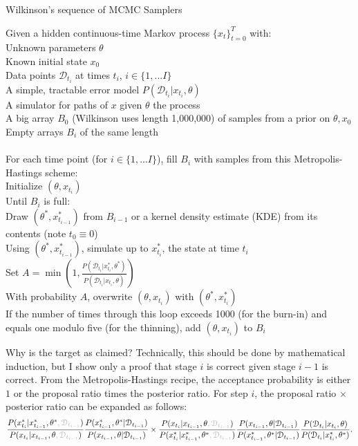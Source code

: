 \documentclass{article}
\begin{document}
\begin{algorithm}[h]
\caption{ \label{pMCMC} Wilkinson's sequence of MCMC Samplers}
Given a hidden continuous-time Markov process $\{x_t\}_{t=0}^T$ with: \\
\Indp \Indp
Unknown parameters $\theta$\\
Known initial state $x_0$\\
Data points $\mathcal{D}_{t_{i}}$ at times $t_{i}$, $i \in \{1, ... I\}$ \\
A simple, tractable error model $P(\mathcal{D}_{t_{i}}|x_{t_{i}}, \theta)$\\
A simulator for paths of $x$ given $\theta$ the process\\
A big array $B_0$ (Wilkinson uses length 1,000,000) of samples from a prior on $\theta, x_0$\\
Empty arrays $B_{i}$ of the same length\\
$\phantom{0}$\\
\Indm \Indm
For each time point (for $i \in \{1, ... I\}$), fill $B_{i}$ with samples from this Metropolis-Hastings scheme:\\
\Indp\Indp
Initialize $(\theta, x_{t_{i}})$ \\
Until $B_{i}$ is full: \\
\Indp\Indp
Draw $(\theta^*, x_{t_{i-1}}^*)$ from $B_{i-1}$ or a kernel density estimate (KDE) from its contents (note $t_0\equiv0$)\\
Using $(\theta^*, x_{t_{i-1}}^*)$, simulate up to $x_{t_{i}}^*$, the state at time $t_{i}$ \\
Set $A=\min(1, \frac{P(\mathcal{D}_{t_{i}}|x_{t_{i}}^*, \theta^*)}{P(\mathcal{D}_{t_{i}}|x_{t_{i}}, \theta)})$\\
With probability $A$, overwrite $(\theta, x_{t_{i}})$ with $(\theta^*, x_{t_{i}}^*)$\\
If the number of times through this loop exceeds 1000 (for the burn-in) and equals one modulo five (for the thinning), add $(\theta, x_{t_{i}})$ to $B_{i}$\\
\Indm \Indm
\end{algorithm}
\pagebreak
Why is the target as claimed? Technically, this should be done by mathematical induction, but I show only a proof that stage $i$ is correct given stage $i-1$ is correct. From the Metropolis-Hastings recipe, the acceptance probability is either $1$ or the proposal ratio times the posterior ratio. For step $i$, the proposal ratio $\times$ posterior ratio can be expanded as follows:
$$ \frac{P(x_{t_{i}}^*| x_{t_{i-1}}^*,\theta^*\gray{, \mathcal{D}_{t_{i-1}}})}{P(x_{t_{i}}| x_{t_{i-1}}, \theta \gray{, \mathcal{D}_{t_{i-1}}})} 
\frac{P(x_{t_{i-1}}^*,\theta^*| \mathcal{D}_{t_{i-1}})}{P(x_{t_{i-1}}, \theta| \mathcal{D}_{t_{i-1}})}
\times 
\frac{P(x_{t_{i}}| x_{t_{i-1}}, \theta \gray{, \mathcal{D}_{t_{i-1}}})}{P(x_{t_{i}}^*| x_{t_{i-1}}^*,\theta^*\gray{, \mathcal{D}_{t_{i-1}}})}
\frac{ P(x_{t_{i-1}}, \theta| \mathcal{D}_{t_{i-1}})}{ P( x_{t_{i-1}}^*,\theta^*| \mathcal{D}_{t_{i-1}})}   
\frac{P(\mathcal{D}_{t_{i}}|x_{t_{i}}, \theta)}{P(\mathcal{D}_{t_{i}}|x_{t_{i}}^*, \theta^*)}.$$   
\end{document}
